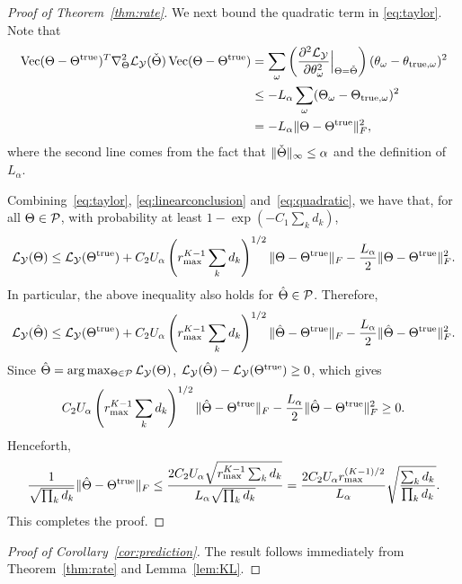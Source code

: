 \documentclass[11pt]{article}
\theoremstyle{plain}
\theoremstyle{definition}
\begin{document}
\begin{proof}[Proof of Theorem~\ref{thm:rate}]
We next bound the quadratic term in \eqref{eq:taylor}. Note that
\begin{align}\label{eq:quadratic}
 \operatorname{Vec}(\Theta-\Theta^{\text{true}})^T \nabla^2_{\Theta}\mathcal{L}_{\mathcal{Y}}(\check{\Theta})\operatorname{Vec}(\Theta-\Theta^{\text{true}})&=\sum_\omega \left( {\partial^2\mathcal{L}_{\mathcal{Y}}\over \partial \theta^2_\omega} \Big|_{\Theta=\check\Theta} \right)(\theta_\omega-\theta_{{\text{true}},\omega})^2 \nonumber \\
&\leq - L_\alpha\sum_{\omega}(\Theta_{\omega}-\Theta_{\text{true},\omega})^2 \nonumber \\
&=-L_\alpha\lVert\Theta-\Theta^{\text{true}}\rVert_F^2,
\end{align}
where the second line comes from the fact that  $\lVert\check\Theta\rVert_\infty\leq \alpha$ and the definition of $L_\alpha$.

Combining~\eqref{eq:taylor}, \eqref{eq:linearconclusion} and~\eqref{eq:quadratic}, we have that, for all $\Theta\in\mathcal{P}$, with probability at least $1-\exp(-C_1 \sum_kd_k)$,
\[
\mathcal{L}_{\mathcal{Y}}(\Theta)\leq \mathcal{L}_{\mathcal{Y}}(\Theta^{\text{true}})+C_2U_\alpha  \left(r_{\max}^{K-1}\sum_k d_k\right)^{1/2}  \lVert\Theta-\Theta^{\text{true}}\rVert_F-{L_\alpha\over 2}\lVert\Theta-\Theta^{\text{true}}\rVert_F^2.
\]
In particular, the above inequality also holds for $\hat \Theta\in\mathcal{P}$. Therefore,
\[
\mathcal{L}_{\mathcal{Y}}(\hat \Theta)\leq \mathcal{L}_{\mathcal{Y}}(\Theta^{\text{true}})+C_2U_\alpha \left(r_{\max}^{K-1}\sum_k d_k\right)^{1/2}  \lVert\hat \Theta-\Theta^{\text{true}}\rVert_F-{L_\alpha\over 2} \lVert\hat \Theta-\Theta^{\text{true}}\rVert_F^2.
\]
Since $\hat \Theta=\arg\max_{\Theta\in\mathcal{P}}\mathcal{L}_{\mathcal{Y}}(\Theta)$, $\mathcal{L}_{\mathcal{Y}}(\hat \Theta)-\mathcal{L}_{\mathcal{Y}}(\Theta^{\text{true}})\geq 0$, which gives
\[
C_2U_\alpha \left(r_{\max}^{K-1}\sum_k d_k\right)^{1/2}  \lVert\hat \Theta-\Theta^{\text{true}}\rVert_F-{L_\alpha\over 2}\lVert\hat \Theta-\Theta^{\text{true}}\rVert_F^2\geq 0.
\]
Henceforth,
\[
{1\over \sqrt{\prod_k d_k}} \lVert\hat \Theta-\Theta^{\text{true}}\rVert_F\leq {2C_2U_\alpha \sqrt{r_{\max}^{K-1}\sum_k d_k}\over L_\alpha \sqrt{\prod_k d_k}}={2C_2U_\alpha r_{\max}^{(K-1)/2}\over L_\alpha} \sqrt{ \sum_k d_k \over \prod_k d_k}.
\]
This completes the proof.
\end{proof}

\begin{proof}[Proof of Corollary~\ref{cor:prediction}]
The result follows immediately from Theorem~\ref{thm:rate} and Lemma~\ref{lem:KL}.
\end{proof}
\end{document}
